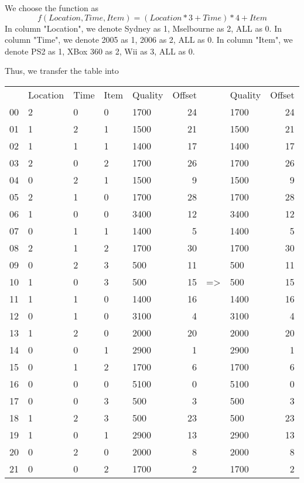\documentclass[a4paper,12pt]{article}
\begin{document}
We choose the function as 
$$ f(Location, Time, Item) = (Location * 3 + Time) * 4 + Item $$
In column "Location", we denote Sydney as 1, Mselbourne as 2, ALL as 0.
In column "Time", we denote 2005 as 1, 2006 as 2, ALL as 0.
In column "Item", we denote PS2 as 1, XBox 360 as 2, Wii as 3, ALL as 0.

Thus, we transfer the table into

\begin{tabular}{lllllrllr}
{} & Location & Time & Item & Quality & Offset & \  & Quality & Offset \\
00 &   2      &  0   &  0   &  1700   &  24    & \  &  1700   &  24  \\
01 &   1      &  2   &  1   &  1500   &  21    & \  &  1500   &  21  \\ 
02 &   1      &  1   &  1   &  1400   &  17    & \  &  1400   &  17  \\
03 &   2      &  0   &  2   &  1700   &  26    & \  &  1700   &  26  \\
04 &   0      &  2   &  1   &  1500   &  9     & \  &  1500   &  9   \\
05 &   2      &  1   &  0   &  1700   &  28    & \  &  1700   &  28  \\
06 &   1      &  0   &  0   &  3400   &  12    & \  &  3400   &  12  \\
07 &   0      &  1   &  1   &  1400   &  5     & \  &  1400   &  5   \\
08 &   2      &  1   &  2   &  1700   &  30    & \  &  1700   &  30  \\
09 &   0      &  2   &  3   &  500    &  11    & \  &  500    &  11  \\
10 &   1      &  0   &  3   &  500    &  15    & => &  500    &  15  \\
11 &   1      &  1   &  0   &  1400   &  16    & \  &  1400   &  16  \\
12 &   0      &  1   &  0   &  3100   &  4     & \  &  3100   &  4   \\
13 &   1      &  2   &  0   &  2000   &  20    & \  &  2000   &  20  \\
14 &   0      &  0   &  1   &  2900   &  1     & \  &  2900   &  1   \\
15 &   0      &  1   &  2   &  1700   &  6     & \  &  1700   &  6   \\
16 &   0      &  0   &  0   &  5100   &  0     & \  &  5100   &  0   \\
17 &   0      &  0   &  3   &  500    &  3     & \  &  500    &  3   \\
18 &   1      &  2   &  3   &  500    &  23    & \  &  500    &  23  \\
19 &   1      &  0   &  1   &  2900   &  13    & \  &  2900   &  13  \\
20 &   0      &  2   &  0   &  2000   &  8     & \  &  2000   &  8   \\
21 &   0      &  0   &  2   &  1700   &  2     & \  &  1700   &  2   \\

\end{tabular}
\end{document}
